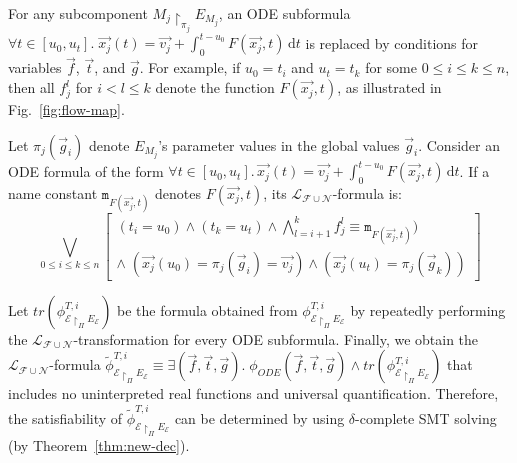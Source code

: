 For any subcomponent $M_j \restriction_{\pi_j} E_{M_j}$,
an ODE subformula $\forall t \in [u_0,u_t].\; \vec{x_j}(t) = \vec{v_j} + \int_0^{t-u_0} \!  F(\vec{x_j},t)\,\mathrm{d}t$ 
is replaced by conditions for variables  $\vec{f}$, $\vec{t}$, and $\vec{g}$.
For example, if $u_0 = t_i$ and $u_t = t_k$ for some $0 \leq i \leq k \leq n$,
then all $f_j^l$ for $i < l \leq k$ 
denote
the function $F(\vec{x_j},t)$,
as illustrated in Fig.~\ref{fig:flow-map}.


\begin{definition}\label{def:ode-trans}
Let  $\pi_j(\vec{g}_i)$ denote $E_{M_j}$'s parameter values 
in the global values $\vec{g}_i$. %
Consider an ODE formula %
of the form 
$\forall t \in [u_0,u_t].\, \vec{x_j}(t) = \vec{v_j} + \int_0^{t-u_0} \!  F(\vec{x_j},t)\,\mathrm{d}t$.
If a name constant $\mathtt{m}_{F(\vec{x_j},t)}$ denotes $F(\vec{x_j},t)$,
its $\mathcal{L}_{\mathcal{F}\cup\mathcal{N}}$-formula is: %
\[
\bigvee_{0 \leq i \leq k \leq n} 
\left[
\begin{aligned}
(t_i = u_0) \wedge (t_k = u_t) \wedge \textstyle\bigwedge_{l=i+1}^{k} f^l_j \equiv \mathtt{m}_{F(\vec{x_j},t)}  )
\\
\wedge\; (\vec{x_j}(u_0) = \pi_j(\vec{g}_i) = \vec{v_j}) \wedge  (\vec{x_j}(u_t) = \pi_j(\vec{g}_k))
\end{aligned}
\right]
\]
\end{definition}

Let $\mathit{tr}(\phi_{\mathcal{E} \restriction_{\Pi} E_\mathcal{E}}^{T,i})$ 
be the formula
obtained from $\phi_{\mathcal{E} \restriction_{\Pi} E_\mathcal{E}}^{T,i}$ 
by repeatedly performing the $\mathcal{L}_{\mathcal{F}\cup\mathcal{N}}$-transformation
for every ODE subformula.
Finally, we obtain the $\mathcal{L}_{\mathcal{F}\cup\mathcal{N}}$-formula 
$\tilde{\phi}_{\mathcal{E} \restriction_{\Pi} E_\mathcal{E}}^{T,i}
\equiv
\exists (\vec{f}, \vec{t}, \vec{g}).\; \phi_{\mathit{ODE}}(\vec{f},\vec{t},\vec{g}) \wedge \mathit{tr}(\phi_{\mathcal{E} \restriction_{\Pi} E_\mathcal{E}}^{T,i})$
that includes no uninterpreted real functions and universal quantification.
Therefore, the  satisfiability of $\tilde{\phi}_{\mathcal{E} \restriction_{\Pi} E_\mathcal{E}}^{T,i}$ can be determined by using
$\delta$-complete SMT solving (by Theorem~\ref{thm:new-dec}).


